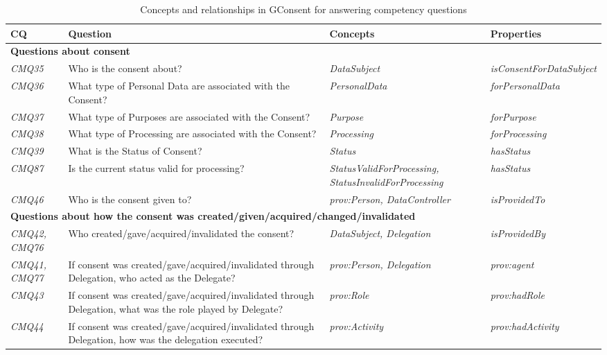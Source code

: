\begin{table}[htbp]
\footnotesize
\centering
{}
\begin{tabularx}{\textwidth}{|p{1cm}|X|p{4cm}|p{3.5cm}|}
\caption{Concepts and relationships in GConsent for answering competency questions} \\ \hline
\textbf{CQ} & \textbf{Question} & \textbf{Concepts} & \textbf{Properties} \\ \hline
\multicolumn{4}{|l|}{\textbf{Questions about consent}} \\ \hline
\textit{CMQ35} & Who is the consent about? & \textit{DataSubject} & \textit{isConsentForDataSubject} \\ \hline
\textit{CMQ36} & What type of Personal Data are associated with the Consent? & \textit{PersonalData} & \textit{forPersonalData} \\ \hline
\textit{CMQ37} & What type of Purposes are associated with the Consent? & \textit{Purpose} & \textit{forPurpose} \\ \hline
\textit{CMQ38} & What type of Processing are associated with the Consent? & \textit{Processing} & \textit{forProcessing} \\ \hline
\textit{CMQ39} & What is the Status of Consent? & \textit{Status} & \textit{hasStatus} \\ \hline
\textit{CMQ87} & Is the current status valid for processing? & \textit{StatusValidForProcessing, StatusInvalidForProcessing} & \textit{hasStatus} \\ \hline
\textit{CMQ46} & Who is the consent given to? & \textit{prov:Person, DataController} & \textit{isProvidedTo} \\ \hline
\multicolumn{4}{|l|}{\textbf{Questions about how the consent was created/given/acquired/changed/invalidated}} \\ \hline
\textit{CMQ42, CMQ76} & Who created/gave/acquired/invalidated the consent? & \textit{DataSubject, Delegation} & \textit{isProvidedBy} \\ \hline
\textit{CMQ41, CMQ77} & If consent was created/gave/acquired/invalidated through Delegation, who acted as the Delegate? & \textit{prov:Person, Delegation} & \textit{prov:agent} \\ \hline
\textit{CMQ43} & If consent was created/gave/acquired/invalidated through Delegation, what was the role played by Delegate? & \textit{prov:Role} & \textit{prov:hadRole} \\ \hline
\textit{CMQ44} & If consent was created/gave/acquired/invalidated through Delegation, how was the delegation executed? & \textit{prov:Activity} & \textit{prov:hadActivity} \\ \hline

\end{tabularx}
\end{table}
